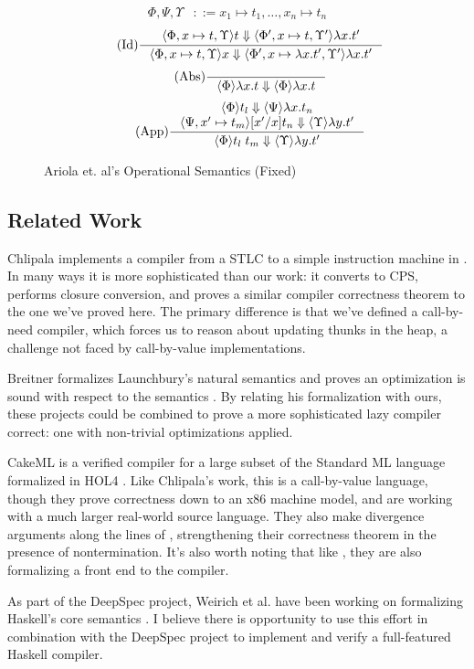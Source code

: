 \begin{figure}
\begin{align*}
\tag{Heap} \Phi, \Psi, \Upsilon &::= x_1 \mapsto t_1, \dots, x_n \mapsto t_n
\end{align*}
\begin{align*}
\tag{Id} \inference
{\langle \Phi, x \mapsto t, \Upsilon \rangle t \Downarrow \langle \Phi', x \mapsto t, \Upsilon' \rangle \lambda x.t'}
{\langle \Phi, x \mapsto t, \Upsilon \rangle x \Downarrow 
 \langle \Phi', x \mapsto \lambda x.t', \Upsilon' \rangle \lambda x.t'}
\end{align*}
\begin{align*}
\tag{Abs} \inference 
{}
{\langle \Phi \rangle \lambda x . t \Downarrow \langle \Phi \rangle \lambda x.t}
\end{align*}
\begin{align*}
\tag{App} \inference
{\langle \Phi \rangle t_l \Downarrow \langle \Psi \rangle \lambda 
x.t_n \\ \langle \Psi, x' \mapsto t_m \rangle [x'/x]t_n \Downarrow \langle
\Upsilon \rangle \lambda y.t'}
{\langle \Phi \rangle t_l \; t_m \Downarrow \langle \Upsilon \rangle \lambda y.t'}
\end{align*}
\caption{Ariola et. al's Operational Semantics (Fixed)}
\label{fig:cbn_fixed}
\end{figure}

\subsection{Related Work}

Chlipala implements a compiler from a STLC to a simple instruction machine in
\cite{chlipala2007certified}. In many ways it is more sophisticated than our 
work: it converts to CPS, performs closure conversion, and proves a similar
compiler correctness theorem to the one we've proved here. The primary
difference is that we've defined a call-by-need compiler, which forces us to
reason about updating thunks in the heap, a challenge not faced by
call-by-value implementations.

Breitner formalizes Launchbury's natural semantics and proves an optimization is
sound with respect to the semantics \cite{launchburynatural,breitnerthesis}. By
relating his formalization with ours, these projects could be combined to prove
a more sophisticated lazy compiler correct: one with non-trivial optimizations
applied.

CakeML \cite{cakeml14} is a verified compiler for a large subset of the Standard
ML language formalized in HOL4 \cite{slind2008brief}. Like Chlipala's work, this
is a call-by-value language, though they prove correctness down to an x86
machine model, and are working with a much larger real-world source language.
They also make divergence arguments along the lines of \cite{functionalbigstep},
strengthening their correctness theorem in the presence of nontermination. It's
also worth noting that like \cite{leroy2012compcert}, they are also formalizing
a front end to the compiler. 

As part of the DeepSpec project, Weirich et al. have been working on formalizing
Haskell's core semantics \cite{weirich2017spec, spector2018total}. I believe
there is opportunity to use this effort in combination with the DeepSpec project
to implement and verify a full-featured Haskell compiler.

